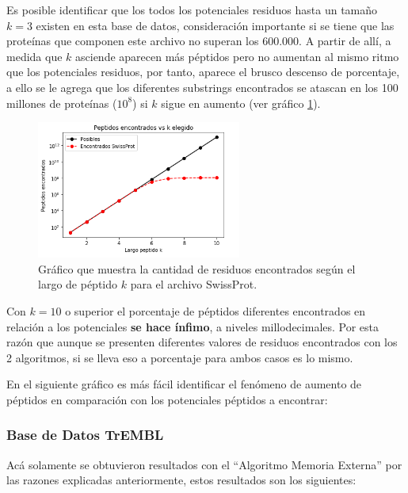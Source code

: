 Es posible identificar que los todos los potenciales residuos hasta un tamaño $k=3$ existen en esta base de datos, consideración importante si se tiene que las proteínas que componen este archivo no superan los 600.000. A partir de allí, a medida que $k$ asciende aparecen más péptidos pero no aumentan al mismo ritmo que los potenciales residuos, por tanto, aparece el brusco descenso de porcentaje, a ello se le agrega que los diferentes substrings encontrados se atascan en los 100 millones de proteínas ($10^{8}$) si $k$ sigue en aumento (ver gráfico \ref{fig:sprot}).

\begin{figure}[h]
    \centering
    \includegraphics[width=0.6\textwidth]{./images/swissprotv1.png}
    \caption{Gráfico que muestra la cantidad de residuos encontrados según el largo de péptido $k$ para el archivo SwissProt.}
    \label{fig:sprot}
\end{figure}

Con $k=10$ o superior el porcentaje de péptidos diferentes encontrados en relación a los potenciales \textbf{se hace ínfimo}, a niveles millodecimales. Por esta razón que aunque se presenten diferentes valores de residuos encontrados con los 2 algoritmos, si se lleva eso a porcentaje para ambos casos es lo mismo.

En el siguiente gráfico es más fácil identificar el fenómeno de aumento de péptidos en comparación con los potenciales péptidos a encontrar:


\subsubsection{Base de Datos TrEMBL}

Acá solamente se obtuvieron resultados con el ``Algoritmo Memoria Externa'' por las razones explicadas anteriormente, estos resultados son los siguientes:

